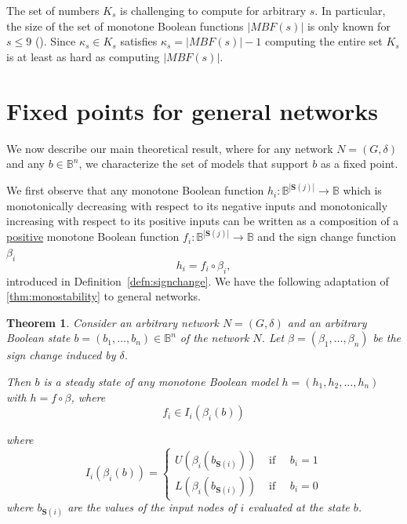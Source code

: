 \documentclass[12pt]{amsart}
\newcommand{\bbB}{\mathbb{B}}
\newcommand{\Sources}{\mathbf{S}}
\newtheorem{thm}{Theorem}[section]
\theoremstyle{definition}
\begin{document}
The set of numbers $K_s$ is challenging to compute for arbitrary $s$. In particular, the size of the set of monotone Boolean functions $|MBF(s)|$ is only known for $s\leq 9$ (\cite{jakel_computation_2023}). Since $\kappa_{s} \in K_s$ satisfies $\kappa_{s} = |MBF(s)|-1$ computing the entire set $K_s$ is at least as hard as computing $|MBF(s)|$. 

\section{Fixed points for general networks} \label{sec:fixedptsgen}

We now describe our main theoretical result, where for any network $N=(G,\delta)$ and any $b \in \bbB^n$, we characterize the set of models that support $b$ as a fixed point. 


We first observe that any monotone Boolean function $h_i: \bbB^{|\Sources(j)|} \to \bbB$ which is monotonically decreasing with respect to its negative inputs and monotonically increasing with respect to its positive inputs can be written as a composition of a \underline{positive} monotone Boolean function $f_i: \bbB^{|\Sources(j)|} \to \bbB$ and the sign change function $\beta_i$
\begin{equation}\label{monotone_flip}
    h_i = f_i\circ \beta_i,
\end{equation}
introduced in Definition~\ref{defn:signchange}.
We have the following adaptation of \cref{thm:monostability} to general networks.

\begin{thm}\label{thm:monostability_gen}
Consider an arbitrary network $N=(G,\delta)$ and an arbitrary Boolean state $b=(b_1, \ldots, b_n)\in \bbB^n$ of the network $N$. Let $\beta=(\beta_1,\ldots, \beta_n)$ be the sign change induced by $\delta$.

Then $b$ is a steady state of any monotone Boolean model $h=(h_1,h_2, \ldots, h_n)$ with $h=f\circ \beta$, where
\[ f_i \in I_i(\beta_i(b))\]

where 
\[ I_i(\beta_i(b))= \left\{ \begin{array}{cc}
U(\beta_i(b_{\Sources(i)})) & \mbox{ if } \quad b_i=1\\
L(\beta_i(b_{\Sources(i)})) &\mbox{ if } \quad b_i=0
\end{array}
\right .
\]
where $b_{\Sources(i)}$ are the values of the input nodes of $i$ evaluated at the state $b$.
\end{thm}
\end{document}
